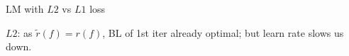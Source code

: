 \documentclass[11pt,compress,t,notes=noshow, xcolor=table]{beamer}
\begin{document}
\begin{frame}{LM with $L2$ vs $L1$ loss}

\vfill

\footnotesize
$L2$: as $\tilde r(f) = r(f)$, BL of 1st iter already optimal; 
but learn rate slows us down.

\end{frame}
% 
% 
% 
% 
% 
% 
% 
% 
% 
% 
% 
% 
% 
\end{document}
